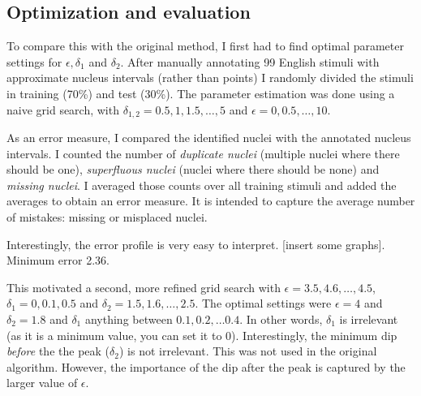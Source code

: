 \documentclass[a4paper,9pt]{article}
\begin{document}
\subsection{Optimization and evaluation}
To compare this with the original method, I first had to find optimal parameter settings for $\epsilon, \delta_1$ and $\delta_2$. After manually annotating 99 English stimuli with approximate nucleus intervals (rather than points) I randomly divided the stimuli in training (70\%) and test (30\%). The parameter estimation was done using a naive grid search, with $\delta_{1,2}=0.5, 1, 1.5, \dots, 5$ and $\epsilon = 0, 0.5, \dots, 10$.
	
As an error measure, I compared the identified nuclei with the annotated nucleus intervals. I counted the number of \emph{duplicate nuclei} (multiple nuclei where there should be one), \emph{superfluous nuclei} (nuclei where there should be none) and \emph{missing nuclei}. I averaged those counts over all training stimuli and added the averages to obtain an error measure. It is intended to capture the average number of mistakes: missing or misplaced nuclei.

Interestingly, the error profile is very easy to interpret. [insert some graphs]. Minimum error 2.36.

This motivated a second, more refined grid search with $\epsilon= 3.5,4.6,\dots, 4.5$,  $\delta_1 = 0, 0.1, 0.5$ and $\delta_2=1.5, 1.6, \dots, 2.5$. The optimal settings were $\epsilon=4$ and $\delta_2 = 1.8$ and $\delta_1$ anything between $0.1, 0.2, \dots 0.4$. In other words, $\delta_1$ is irrelevant (as it is a minimum value, you can set it to 0). Interestingly, the minimum dip \emph{before} the the peak ($\delta_2$) is not irrelevant. This was not used in the original algorithm. However, the importance of the dip after the peak is captured by the larger value of $\epsilon$.

\newpage





\begin{multicols}{2}
\printbibliography
\end{multicols}
\end{document}
